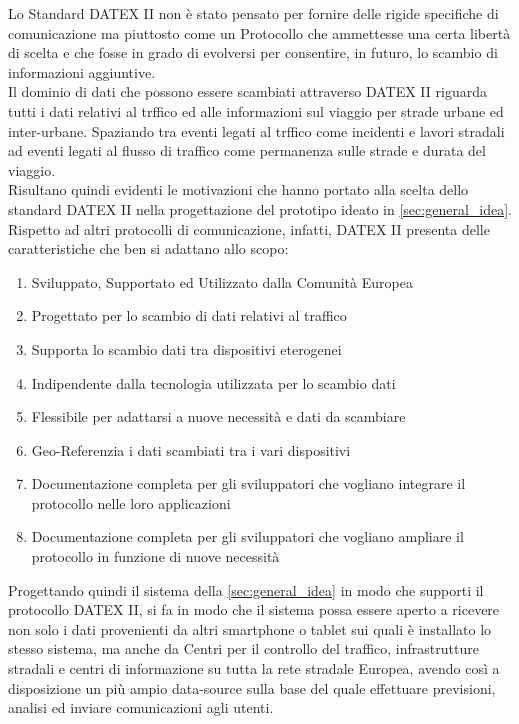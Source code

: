 Lo Standard DATEX II non è stato pensato per fornire delle rigide specifiche di comunicazione ma piuttosto come un Protocollo che ammettesse una certa libertà di scelta e che fosse in grado di evolversi per consentire, in futuro, lo scambio di informazioni aggiuntive.\\
Il dominio di dati che possono essere scambiati attraverso DATEX II riguarda tutti i dati relativi al trffico ed alle informazioni sul viaggio per strade urbane ed inter-urbane. Spaziando tra eventi legati al trffico come incidenti e lavori stradali ad eventi legati al flusso di traffico come permanenza sulle strade e durata del viaggio. \\
Risultano quindi evidenti le motivazioni che hanno portato alla scelta dello standard DATEX II nella progettazione del prototipo ideato in \autoref{sec:general_idea}. Rispetto ad altri protocolli di comunicazione, infatti, DATEX II presenta delle caratteristiche che ben si adattano allo scopo:
\begin{enumerate}
	\item Sviluppato, Supportato ed Utilizzato dalla Comunità Europea
	\item Progettato per lo scambio di dati relativi al traffico
	\item Supporta lo scambio dati tra dispositivi eterogenei
	\item Indipendente dalla tecnologia utilizzata per lo scambio dati
	\item Flessibile per adattarsi a nuove necessità e dati da scambiare
	\item Geo-Referenzia i dati scambiati tra i vari dispositivi
	\item Documentazione completa per gli sviluppatori che vogliano integrare il protocollo nelle loro applicazioni
	\item Documentazione completa per gli sviluppatori che vogliano ampliare il protocollo in funzione di nuove necessità
\end{enumerate}
Progettando quindi il sistema della \autoref{sec:general_idea} in modo che supporti il protocollo DATEX II, si fa in modo che il sistema possa essere aperto a ricevere non solo i dati provenienti da altri smartphone o tablet sui quali è installato lo stesso sistema, ma anche da Centri per il controllo del traffico, infrastrutture stradali e centri di informazione su tutta la rete stradale Europea, avendo così a disposizione un più ampio data-source sulla base del quale effettuare previsioni, analisi ed inviare comunicazioni agli utenti.

